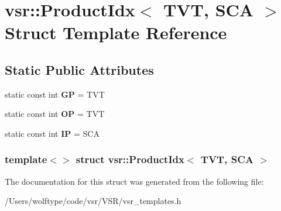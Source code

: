 \hypertarget{structvsr_1_1_product_idx_3_01_t_v_t_00_01_s_c_a_01_4}{\section{vsr\-:\-:Product\-Idx$<$ T\-V\-T, S\-C\-A $>$ Struct Template Reference}
\label{structvsr_1_1_product_idx_3_01_t_v_t_00_01_s_c_a_01_4}
}
\subsection*{Static Public Attributes}
\begin{DoxyCompactItemize}
\item 
\hypertarget{structvsr_1_1_product_idx_3_01_t_v_t_00_01_s_c_a_01_4_a15d52ea9676e8ef259303df2b86a66ec}{static const int {\bfseries G\-P} = T\-V\-T}\label{structvsr_1_1_product_idx_3_01_t_v_t_00_01_s_c_a_01_4_a15d52ea9676e8ef259303df2b86a66ec}

\item 
\hypertarget{structvsr_1_1_product_idx_3_01_t_v_t_00_01_s_c_a_01_4_a56f48d6ce226626184cb9d1c9e05e45a}{static const int {\bfseries O\-P} = T\-V\-T}\label{structvsr_1_1_product_idx_3_01_t_v_t_00_01_s_c_a_01_4_a56f48d6ce226626184cb9d1c9e05e45a}

\item 
\hypertarget{structvsr_1_1_product_idx_3_01_t_v_t_00_01_s_c_a_01_4_a8f303f0d8fcb3557f0a22d1c8b6fb75c}{static const int {\bfseries I\-P} = S\-C\-A}\label{structvsr_1_1_product_idx_3_01_t_v_t_00_01_s_c_a_01_4_a8f303f0d8fcb3557f0a22d1c8b6fb75c}

\end{DoxyCompactItemize}
\subsubsection*{template$<$$>$ struct vsr\-::\-Product\-Idx$<$ T\-V\-T, S\-C\-A $>$}



The documentation for this struct was generated from the following file\-:\begin{DoxyCompactItemize}
\item 
/\-Users/wolftype/code/vsr/\-V\-S\-R/vsr\-\_\-templates.\-h\end{DoxyCompactItemize}
